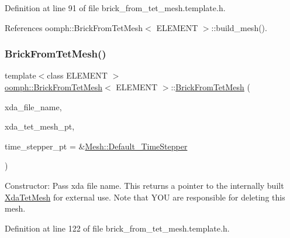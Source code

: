 Definition at line 91 of file brick\+\_\+from\+\_\+tet\+\_\+mesh.\+template.\+h.



References oomph\+::\+Brick\+From\+Tet\+Mesh$<$ E\+L\+E\+M\+E\+N\+T $>$\+::build\+\_\+mesh().

\mbox{\label{classoomph_1_1BrickFromTetMesh_a49d6a583221a04f2997dae4509592350}} 
\subsubsection{\texorpdfstring{Brick\+From\+Tet\+Mesh()}{BrickFromTetMesh()}\hspace{0.1cm}{\footnotesize\ttfamily [3/3]}}
{\footnotesize\ttfamily template$<$class E\+L\+E\+M\+E\+NT $>$ \\
\hyperlink{classoomph_1_1BrickFromTetMesh}{oomph\+::\+Brick\+From\+Tet\+Mesh}$<$ E\+L\+E\+M\+E\+NT $>$\+::\hyperlink{classoomph_1_1BrickFromTetMesh}{Brick\+From\+Tet\+Mesh} (\begin{DoxyParamCaption}\item[{const std\+::string}]{xda\+\_\+file\+\_\+name,  }\item[{\hyperlink{classoomph_1_1XdaTetMesh}{Xda\+Tet\+Mesh}$<$ \hyperlink{classoomph_1_1TElement}{T\+Element}$<$ 3, 3 $>$ $>$ $\ast$\&}]{xda\+\_\+tet\+\_\+mesh\+\_\+pt,  }\item[{\hyperlink{classoomph_1_1TimeStepper}{Time\+Stepper} $\ast$}]{time\+\_\+stepper\+\_\+pt = {\ttfamily \&\hyperlink{classoomph_1_1Mesh_a12243d0fee2b1fcee729ee5a4777ea10}{Mesh\+::\+Default\+\_\+\+Time\+Stepper}} }\end{DoxyParamCaption})\hspace{0.3cm}{\ttfamily [inline]}}



Constructor\+: Pass xda file name. This returns a pointer to the internally built \hyperlink{classoomph_1_1XdaTetMesh}{Xda\+Tet\+Mesh} for external use. Note that Y\+OU are responsible for deleting this mesh. 



Definition at line 122 of file brick\+\_\+from\+\_\+tet\+\_\+mesh.\+template.\+h.



